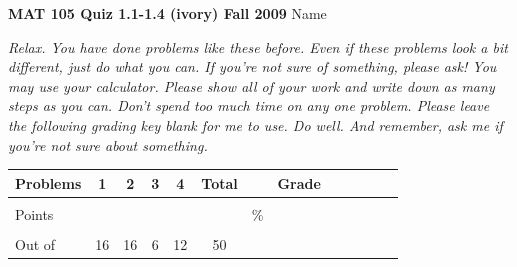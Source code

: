 \documentclass[12pt]{article}
\begin{document}
{\bf MAT 105 Quiz 1.1-1.4 (ivory) Fall 2009} \hspace{.4in} {\large Name} \hrulefill

\hrulefill

 \emph{Relax.  You have done problems like these before.  Even if these problems look a bit different, just do what you can.  If you're not sure of something, please ask! You may use your calculator.  Please show all of your work and write down as many steps as you can.  Don't spend too much time on any one problem.  Please leave the following grading key blank for me to use.  Do well.  And remember, ask me if you're not sure about something.}

\begin{center}

\begin{tabular}
{|l|c|c|c|c|c|c|c|c|c|c|c|c|} \hline

 Problems & \hspace{5 pt} 1 \hspace{5 pt}  & \hspace{5 pt} 2 \hspace{5 pt} & \hspace{5 pt} 3 \hspace{5 pt} & \hspace{5 pt} 4 \hspace{5 pt} &  \hspace{5 pt} Total  \hspace{5 pt} & &  \hspace{5 pt} Grade \hspace{5 pt}  \\ \hline
&&&&& &&\\  
Points &&&&& &    \hspace{.8in}\% &  \\ 
&&&&& && \\  \hline
Out of & 16 & 16 & 6 & 12 &50 & & \\ \hline

\end {tabular}

\end{center}

\hrulefill
\end{document}
